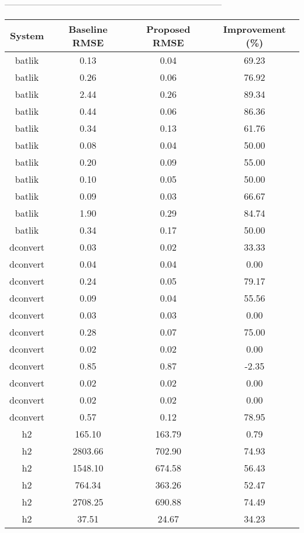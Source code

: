 --------------------------------------------------------------------------------
\begin{table}[h]
    \centering
    \begin{tabular}{|c|c|c|c|}
        \hline
        System & Baseline RMSE & Proposed RMSE & Improvement (\%) \\
        \hline
        batlik & 0.13 & 0.04 & 69.23 \\
        batlik & 0.26 & 0.06 & 76.92 \\
        batlik & 2.44 & 0.26 & 89.34 \\
        batlik & 0.44 & 0.06 & 86.36 \\
        batlik & 0.34 & 0.13 & 61.76 \\
        batlik & 0.08 & 0.04 & 50.00 \\
        batlik & 0.20 & 0.09 & 55.00 \\
        batlik & 0.10 & 0.05 & 50.00 \\
        batlik & 0.09 & 0.03 & 66.67 \\
        batlik & 1.90 & 0.29 & 84.74 \\
        batlik & 0.34 & 0.17 & 50.00 \\
        dconvert & 0.03 & 0.02 & 33.33 \\
        dconvert & 0.04 & 0.04 & 0.00 \\
        dconvert & 0.24 & 0.05 & 79.17 \\
        dconvert & 0.09 & 0.04 & 55.56 \\
        dconvert & 0.03 & 0.03 & 0.00 \\
        dconvert & 0.28 & 0.07 & 75.00 \\
        dconvert & 0.02 & 0.02 & 0.00 \\
        dconvert & 0.85 & 0.87 & -2.35 \\
        dconvert & 0.02 & 0.02 & 0.00 \\
        dconvert & 0.02 & 0.02 & 0.00 \\
        dconvert & 0.57 & 0.12 & 78.95 \\
        h2 & 165.10 & 163.79 & 0.79 \\
        h2 & 2803.66 & 702.90 & 74.93 \\
        h2 & 1548.10 & 674.58 & 56.43 \\
        h2 & 764.34 & 363.26 & 52.47 \\
        h2 & 2708.25 & 690.88 & 74.49 \\
        h2 & 37.51 & 24.67 & 34.23 \\

\end{tabular}
\end{table}

